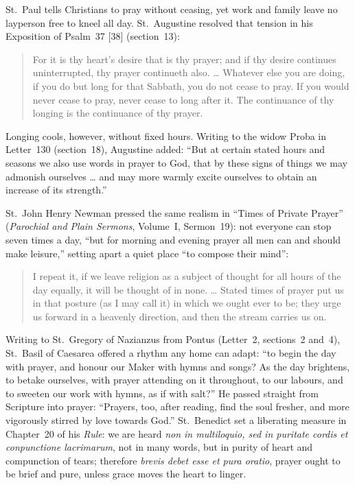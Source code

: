 St.~Paul tells Christians to pray without ceasing, yet work and family leave no layperson free to kneel all day. St.~Augustine resolved that tension in his Exposition of Psalm~37 [38] (section~13):

\begin{quote}
For it is thy heart's desire that is thy prayer; and if thy desire continues uninterrupted, thy prayer continueth also. \ldots{} Whatever else you are doing, if you do but long for that Sabbath, you do not cease to pray. If you would never cease to pray, never cease to long after it. The continuance of thy longing is the continuance of thy prayer.
\end{quote}

Longing cools, however, without fixed hours. Writing to the widow Proba in Letter~130 (section~18), Augustine added: ``But at certain stated hours and seasons we also use words in prayer to God, that by these signs of things we may admonish ourselves \ldots{} and may more warmly excite ourselves to obtain an increase of its strength.''

St.~John Henry Newman pressed the same realism in ``Times of Private Prayer'' (\textit{Parochial and Plain Sermons}, Volume~I, Sermon~19): not everyone can stop seven times a day, ``but for morning and evening prayer all men can and should make leisure,'' setting apart a quiet place ``to compose their mind'':

\begin{quote}
I repeat it, if we leave religion as a subject of thought for all hours of the day equally, it will be thought of in none. \ldots{} Stated times of prayer put us in that posture (as I may call it) in which we ought ever to be; they urge us forward in a heavenly direction, and then the stream carries us on.
\end{quote}

Writing to St.~Gregory of Nazianzus from Pontus (Letter~2, sections~2 and~4), St.~Basil of Caesarea offered a rhythm any home can adapt: ``to begin the day with prayer, and honour our Maker with hymns and songs? As the day brightens, to betake ourselves, with prayer attending on it throughout, to our labours, and to sweeten our work with hymns, as if with salt?'' He passed straight from Scripture into prayer: ``Prayers, too, after reading, find the soul fresher, and more vigorously stirred by love towards God.'' St.~Benedict set a liberating measure in Chapter~20 of his \textit{Rule}: we are heard \textit{non in multiloquio, sed in puritate cordis et conpunctione lacrimarum}, not in many words, but in purity of heart and compunction of tears; therefore \textit{brevis debet esse et pura oratio}, prayer ought to be brief and pure, unless grace moves the heart to linger.

